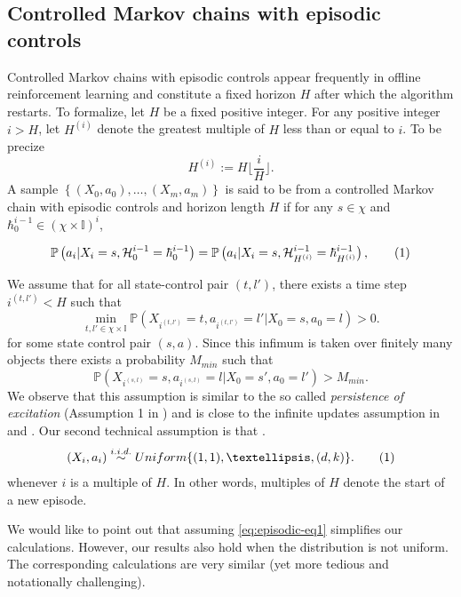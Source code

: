 \documentclass[opre,sglanonrev]{informs4}
\numberwithin{equation}{section}
\newcommand{\pow}[1]{^{(#1)}}
\newcommand{\lp}{\left(}
\newcommand{\rp}{\right)}
\newcommand{\lc}{\left\{}
\newcommand{\rc}{\right\}}
\newcommand{\History}{\mathcal{H}}
\newcommand{\history}{\hbar}
\newcommand{\Ibb}{\mathbb{I}}
\newcommand{\Pbb}{\mathbb{P}}
\newcommand{\indexeddata}{\left\{(X_0,a_0),\dots,(X_m,a_m)\right\}}
\newcommand\numberthis{\addtocounter{equation}{1}\tag{\theequation}}
\newcommand{\prob}{\Pbb}
\newcommand{\probl}{\prob}
\begin{document}
\begin{APPENDICES}
\subsection{Controlled Markov chains with episodic controls}
{
Controlled Markov chains with episodic controls appear frequently in offline reinforcement learning  \citep{rashidinejad2021bridging,li2022settling,li2022settlingh,yin2021towards} and constitute a fixed horizon $H$ after which the algorithm restarts. To formalize,
}
let $H $ be a fixed positive integer. For any positive integer $i>H $, let $H \pow{i}$ denote the greatest multiple of $H$ less than or equal to $i$. To be precize
\[
H \pow{i}:=H \lfloor\frac{i}{H}\rfloor.
\]
A sample $\indexeddata$ is said to be from a controlled Markov chain with episodic controls and horizon length $H $ if for any $s\in\chi$ and $\history_0^{i-1}\in(\chi\times\Ibb)^i$,
\begin{small}
\begin{align*}
\probl\lp a_i|X_i=s,\History_0^{i-1}=\history_0^{i-1}\rp = \probl\lp a_i|X_i=s, \History_{H ^{(i)}}^{i-1}=\history_{H \pow{i}}^{i-1}\rp,\numberthis\label{eq:episodic-eq2}
\end{align*}    
\end{small}
We assume that for all state-control pair $(t,l')$, there exists a time step $i^{(t,l')}<H $ such that 
\[
\min_{t,l'\in\chi\times\Ibb}\prob\lp X_{i^{(t,l')}}=t,a_{i^{(t,l')}}=l'|X_0=s, a_0=l \rp>0.
\]
for some state control pair $(s,a)$. Since this infimum is taken over finitely many objects there exists a probability $M_{min}$ such that
\[
\prob\lp X_{i^{(s,l)}}=s,a_{i^{(s,l)}}=l|X_0=s', a_0=l' \rp>M_{min}. 
\]
We observe that this assumption is similar to the so called \textit{persistence of excitation} (Assumption 1 in \cite{beck2012error}) and is close to the infinite updates assumption in \cite{yu2013boundedness} and \cite{yu2013q}. Our second technical assumption is that .  %
\begin{align*}
    (X_i,a_i)\overset{i.i.d.}{\sim} Uniform{\lc(1,1),\dots,(d,k)\rc}.\numberthis\label{eq:episodic-eq1}
\end{align*}
whenever $i$ is a multiple of $H$.
In other words, multiples of $H$ denote the start of a new episode.
\begin{remark}
We would like to point out that assuming \cref{eq:episodic-eq1} simplifies our calculations. However, our results also hold when the distribution is not uniform. The corresponding calculations are very similar (yet more tedious and notationally challenging). 

\end{remark}
\end{APPENDICES}
\end{document}
